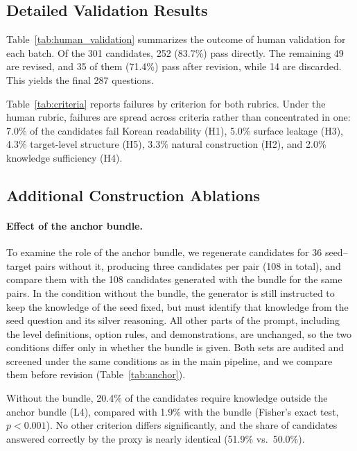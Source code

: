 \subsection{Detailed Validation Results}

Table~\ref{tab:human_validation} summarizes the outcome of human validation for each batch.
Of the 301 candidates, 252 (83.7\%) pass directly.
The remaining 49 are revised, and 35 of them (71.4\%) pass after revision, while 14 are discarded.
This yields the final 287 questions.



Table~\ref{tab:criteria} reports failures by criterion for both rubrics.
Under the human rubric, failures are spread across criteria rather than concentrated in one: 7.0\% of the candidates fail Korean readability (H1), 5.0\% surface leakage (H3), 4.3\% target-level structure (H5), 3.3\% natural construction (H2), and 2.0\% knowledge sufficiency (H4).



\subsection{Additional Construction Ablations}

\paragraph{Effect of the anchor bundle.}
To examine the role of the anchor bundle, we regenerate candidates for 36 seed--target pairs without it, producing three candidates per pair (108 in total), and compare them with the 108 candidates generated with the bundle for the same pairs.
In the condition without the bundle, the generator is still instructed to keep the knowledge of the seed fixed, but must identify that knowledge from the seed question and its silver reasoning.
All other parts of the prompt, including the level definitions, option rules, and demonstrations, are unchanged, so the two conditions differ only in whether the bundle is given.
Both sets are audited and screened under the same conditions as in the main pipeline, and we compare them before revision (Table~\ref{tab:anchor}).



Without the bundle, 20.4\% of the candidates require knowledge outside the anchor bundle (L4), compared with 1.9\% with the bundle (Fisher's exact test, $p < 0.001$).
No other criterion differs significantly, and the share of candidates answered correctly by the proxy is nearly identical (51.9\% vs.\ 50.0\%).

